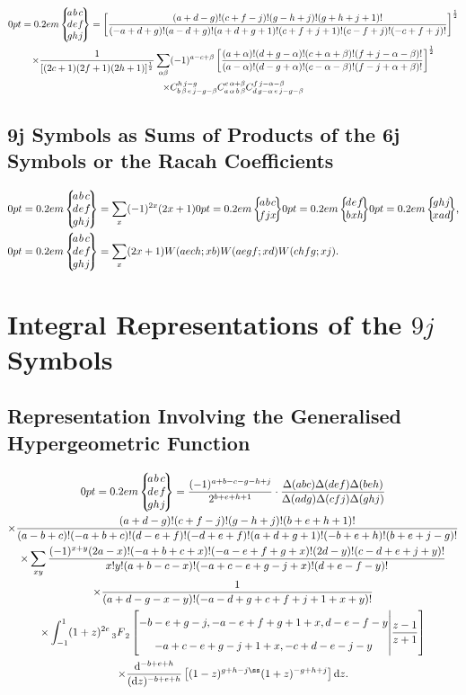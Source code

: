 \begin{multline}
\ninej{a}{b}{c}{d}{e}{f}{g}{h}{j}=\left[\frac{(a+d-g)!(c+f-j)!(g-h+j)!(g+h+j+1)!}{(-a+d+g)!(a-d+g)!(a+d+g+1)!(c+f+j+1)!(c-f+j)!(-c+f+j)!}\right]^{\frac{1}{2}}  \\
\times \frac{1}{[(2 c+1)(2 f+1)(2 h+1)]^{\frac{1}{2}}} \sum_{\alpha \beta}(-1)^{a-c+\beta}\left[\frac{(a+\alpha)!(d+g-\alpha)!(c+\alpha+\beta)!(f+j-\alpha-\beta)!}{(a-\alpha)!(d-g+\alpha)!(c-\alpha-\beta)!(f-j+\alpha+\beta)!}\right]^{\frac{1}{2}}  \\
\times \clebsch{b}{\beta}{e}{j-g-\beta}{h}{j-g} \clebsch{a}{\alpha}{b}{\beta}{c}{\alpha+\beta} \clebsch{d}{g-\alpha}{e}{j-g-\beta}{f}{j-\alpha-\beta} \label{eq:10:2:19}
\end{multline}
\subsection{9j Symbols as Sums of Products of the 6j Symbols or the Racah Coefficients \cite{ref110,ref074}}\label{sec:10.2.4}
\begin{align}
& \ninej{a}{b}{c}{d}{e}{f}{g}{h}{j}=\sum_{x}(-1)^{2 x}(2 x+1)\sixj{a}{b}{c}{f}{j}{x}\sixj{d}{e}{f}{b}{x}{h}\sixj{g}{h}{j}{x}{a}{d},  \label{eq:10:2:20}\\
& \ninej{a}{b}{c}{d}{e}{f}{g}{h}{j}=\sum_{x}(2 x+1) W( aech;  x b) W( aegf  ; x d) W(ch f g ; x j) . \label{eq:10:2:21}
\end{align}
\section{Integral Representations of the \texorpdfstring{$9j$}{9j} Symbols}\label{sec:10.3}
\subsection{Representation Involving the Generalised Hypergeometric Function}\label{sec:10.3.1}
\begin{multline}
\ninej{a}{b}{c}{d}{e}{f}{g}{h}{j}=\frac{(-1)^{a+b-c-g-h+j}}{2^{b+e+h+1}} \cdot \frac{\Delta(a b c) \Delta(d e f) \Delta(b e h)}{\Delta(a d g) \Delta(c f j) \Delta(g h j)}  \\
\times \frac{(a+d-g)!(c+f-j)!(g-h+j)!(b+e+h+1)!}{(a-b+c)!(-a+b+c)!(d-e+f)!(-d+e+f)!(a+d+g+1)!(-b+e+h)!(b+e+j-g)!}  \\
\times \sum_{x y} \frac{(-1)^{x+y}(2 a-x)!(-a+b+c+x)!(-a-e+f+g+x)!(2 d-y)!(c-d+e+j+y)!}{x!y!(a+b-c-x)!(-a+c-e+g-j+x)!(d+e-f-y)!} \\
\times \frac{1}{(a+d-g-x-y)!(-a-d+g+c+f+j+1+x+y)!}  \\
\times \int_{-1}^{1}(1+z)^{2 e}
\Fnm[s]{3}{2}{-b-e+g-j,-a-e+f+g+1+x, d-e-f-y }{-a+c-e+g-j+1+x,-c+d-e-j-y}{\frac{z-1}{z+1}} \\
\times \frac{\dd^{-b+e+h}}{(\dd z)^{-b+e+h}}\left[(1-z)^{g+h-jß}(1+z)^{-g+h+j}\right] \dd z . \label{eq:10:3:1}
\end{multline}
